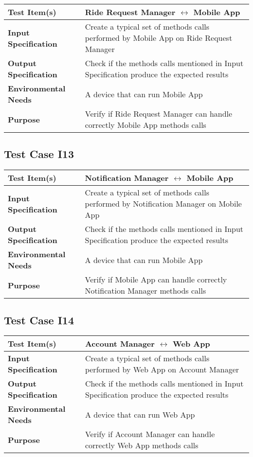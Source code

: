   	\begin{tabular}{p{} p{}}
  		\hline
  		\textbf{Test Item(s)} & Ride Request Manager $ \longleftrightarrow $   Mobile App\\
  		\hline
  		\textbf{Input Specification} & Create a typical set of methods calls performed by Mobile App on Ride Request Manager\\
  		\hline
  		\textbf{Output Specification} & Check if the methods calls mentioned in Input Specification produce the expected results\\
  		\hline
  		\textbf{Environmental Needs} &  A device that can run Mobile App\\
  		\hline
  		\textbf{Purpose} & Verify if Ride Request Manager can handle correctly Mobile App methods calls \\
  		\hline
  	\end{tabular}
  
  
  
  \subsection{Test Case I13}
  
    \begin{tabular}{p{} p{}}
	\hline
	\textbf{Test Item(s)} & Notification Manager $ \longleftrightarrow $   Mobile App\\
	\hline
	\textbf{Input Specification} & Create a typical set of methods calls performed by Notification Manager on Mobile App\\
	\hline
	\textbf{Output Specification} & Check if the methods calls mentioned in Input Specification produce the expected results\\
	\hline
	\textbf{Environmental Needs} &  A device that can run Mobile App\\
	\hline
	\textbf{Purpose} & Verify if Mobile App can handle correctly Notification Manager methods calls \\
	\hline
    \end{tabular}
  
  
  \newpage 
  \subsection{Test Case I14}
  
  	\begin{tabular}{p{} p{}}
  		\hline
  		\textbf{Test Item(s)} & Account Manager $ \longleftrightarrow $   Web App\\
  		\hline
  		\textbf{Input Specification} & Create a typical set of methods calls performed by Web App on Account Manager\\
  		\hline
  		\textbf{Output Specification} & Check if the methods calls mentioned in Input Specification produce the expected results\\
  		\hline
		\textbf{Environmental Needs} &  A device that can run Web App\\
  		\hline
  		\textbf{Purpose} & Verify if Account Manager can handle correctly Web App methods calls \\
  		\hline
  	\end{tabular}
  
